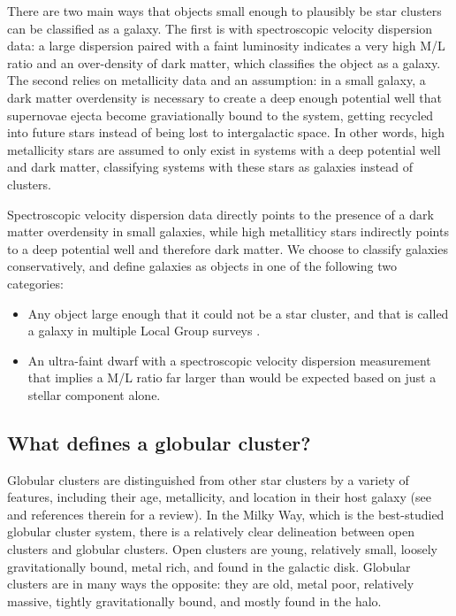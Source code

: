 \documentclass[twocolumn]{aastex631}
\begin{document}
There are two main ways that objects small enough to plausibly be star clusters can be classified as a galaxy. The first is with spectroscopic velocity dispersion data: a large dispersion paired with a faint luminosity indicates a very high M/L ratio and an over-density of dark matter, which classifies the object as a galaxy. The second relies on metallicity data and an assumption: in a small galaxy, a dark matter overdensity is necessary to create a deep enough potential well that supernovae ejecta become graviationally bound to the system, getting recycled into future stars instead of being lost to intergalactic space. In other words, high metallicity stars are assumed to only exist in systems with a deep potential well and dark matter, classifying systems with these stars as galaxies instead of clusters. 

Spectroscopic velocity dispersion data directly points to the presence of a dark matter overdensity in small galaxies, while high metalliticy stars indirectly points to a deep potential well and therefore dark matter. We choose to classify galaxies conservatively, and define galaxies as objects in one of the following two categories:
\begin{itemize}
    \item Any object large enough that it could not be a star cluster, and that is called a galaxy in multiple Local Group surveys \citep[i.e.][]{McConnachie2012, Simon2019, DrlicaWagner2020}.
    \item An ultra-faint dwarf with a spectroscopic velocity dispersion measurement that implies a M/L ratio far larger than would be expected based on just a stellar component alone.
\end{itemize}

\subsection{What defines a globular cluster?} \label{subsec:gcdef}

Globular clusters are distinguished from other star clusters by a variety of features, including their age, metallicity, and location in their host galaxy (see \citet{Harris2010} and references therein for a review). In the Milky Way, which is the best-studied globular cluster system, there is a relatively clear delineation between open clusters and globular clusters. Open clusters are young, relatively small, loosely gravitationally bound, metal rich, and found in the galactic disk. Globular clusters are in many ways the opposite: they are old, metal poor, relatively massive, tightly gravitationally bound, and mostly found in the halo. 
\end{document}
